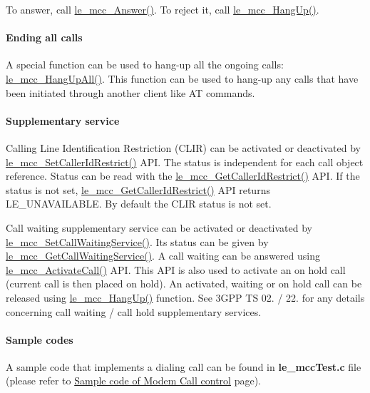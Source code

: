 To answer, call \hyperlink{le__mcc__interface_8h_a598349c6ccfa151dbd1d2f2a9c293ca4}{le\+\_\+mcc\+\_\+\+Answer()}. To reject it, call \hyperlink{le__mcc__interface_8h_a7b9567715a3cd30c83a3b6886eeb2044}{le\+\_\+mcc\+\_\+\+Hang\+Up()}.\hypertarget{c_mcc_le_mcc_ending_all_call}{}\paragraph{Ending all calls}\label{c_mcc_le_mcc_ending_all_call}
A special function can be used to hang-\/up all the ongoing calls\+: \hyperlink{le__mcc__interface_8h_a38ac8543a579ecc81430c121a64bd346}{le\+\_\+mcc\+\_\+\+Hang\+Up\+All()}. This function can be used to hang-\/up any calls that have been initiated through another client like AT commands.\hypertarget{c_mcc_le_mcc_ss}{}\paragraph{Supplementary service}\label{c_mcc_le_mcc_ss}
Calling Line Identification Restriction (C\+L\+IR) can be activated or deactivated by \hyperlink{le__mcc__interface_8h_a6b7fda9b1d0f0208a99b4bdcafe97538}{le\+\_\+mcc\+\_\+\+Set\+Caller\+Id\+Restrict()} A\+PI. The status is independent for each call object reference. Status can be read with the \hyperlink{le__mcc__interface_8h_a54093f7d51cae9a186a97aa799ac3ddc}{le\+\_\+mcc\+\_\+\+Get\+Caller\+Id\+Restrict()} A\+PI. If the status is not set, \hyperlink{le__mcc__interface_8h_a54093f7d51cae9a186a97aa799ac3ddc}{le\+\_\+mcc\+\_\+\+Get\+Caller\+Id\+Restrict()} A\+PI returns L\+E\+\_\+\+U\+N\+A\+V\+A\+I\+L\+A\+B\+LE. By default the C\+L\+IR status is not set.

Call waiting supplementary service can be activated or deactivated by \hyperlink{le__mcc__interface_8h_ac637e687387a5b8cf9c5b02cbb7816fa}{le\+\_\+mcc\+\_\+\+Set\+Call\+Waiting\+Service()}. Its status can be given by \hyperlink{le__mcc__interface_8h_acdf73f5a2e498ee201d8a11c416de29b}{le\+\_\+mcc\+\_\+\+Get\+Call\+Waiting\+Service()}. A call waiting can be answered using \hyperlink{le__mcc__interface_8h_a62626d9db0d9bf56fb2660d9acfdfcc5}{le\+\_\+mcc\+\_\+\+Activate\+Call()} A\+PI. This A\+PI is also used to activate an on hold call (current call is then placed on hold). An activated, waiting or on hold call can be released using \hyperlink{le__mcc__interface_8h_a7b9567715a3cd30c83a3b6886eeb2044}{le\+\_\+mcc\+\_\+\+Hang\+Up()} function. See 3\+G\+PP TS 02. / 22. for any details concerning call waiting / call hold supplementary services.\hypertarget{c_mcc_le_mcc_samples}{}\paragraph{Sample codes}\label{c_mcc_le_mcc_samples}
A sample code that implements a dialing call can be found in {\bfseries le\+\_\+mcc\+Test.\+c} file (please refer to \hyperlink{c_mccTest}{Sample code of Modem Call control} page).






